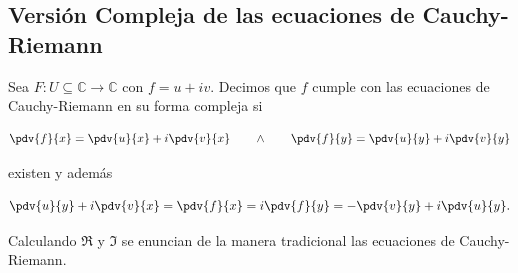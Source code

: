 \documentclass[../main.tex]{subfiles}
\begin{document}
\subsection{Versión Compleja de las ecuaciones de Cauchy-Riemann}\label{sec:cr-compleja}

Sea \(F \colon U \subseteq \mathbb{C} \to \mathbb{C}\) con \(f = u + iv\). Decimos que
\(f\) cumple con las ecuaciones de Cauchy-Riemann en su forma compleja si

\begin{equation}
    \pdv{f}{x} = \pdv{u}{x} + i \pdv{v}{x}\qquad \wedge \qquad \pdv{f}{y} =
    \pdv{u}{y} + i
    \pdv{v}{y}
\end{equation}

existen y además

\begin{equation}
    \pdv{u}{y} + i \pdv{v}{x} = \pdv{f}{x} = i \pdv{f}{y} = - \pdv{v}{y} + i \pdv{u}{y}.
\end{equation}

Calculando \(\Re\) y \(\Im\) se enuncian de la manera tradicional las ecuaciones de
Cauchy-Riemann.
\end{document}
